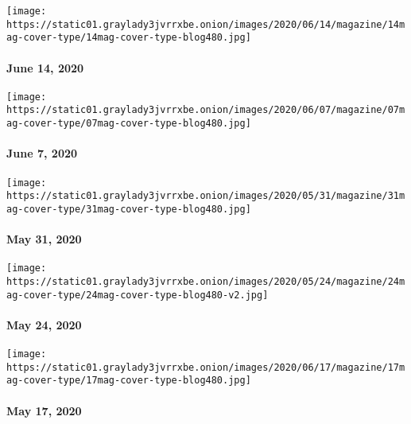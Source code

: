 \href{https://www.nytimes3xbfgragh.onion/issue/magazine/2020/06/12/the-61420-issue}{}

\texttt{[image: https://static01.graylady3jvrrxbe.onion/images/2020/06/14/magazine/14mag-cover-type/14mag-cover-type-blog480.jpg]}

\hypertarget{june-14-2020}{%
\paragraph{June 14, 2020}\label{june-14-2020}}

\href{https://www.nytimes3xbfgragh.onion/issue/magazine/2020/06/05/the-6720-issue}{}

\texttt{[image: https://static01.graylady3jvrrxbe.onion/images/2020/06/07/magazine/07mag-cover-type/07mag-cover-type-blog480.jpg]}

\hypertarget{june-7-2020}{%
\paragraph{June 7, 2020}\label{june-7-2020}}

\href{https://www.nytimes3xbfgragh.onion/issue/magazine/2020/05/29/the-53120-issue}{}

\texttt{[image: https://static01.graylady3jvrrxbe.onion/images/2020/05/31/magazine/31mag-cover-type/31mag-cover-type-blog480.jpg]}

\hypertarget{may-31-2020}{%
\paragraph{May 31, 2020}\label{may-31-2020}}

\href{https://www.nytimes3xbfgragh.onion/issue/magazine/2020/05/22/the-52420-issue}{}

\texttt{[image: https://static01.graylady3jvrrxbe.onion/images/2020/05/24/magazine/24mag-cover-type/24mag-cover-type-blog480-v2.jpg]}

\hypertarget{may-24-2020}{%
\paragraph{May 24, 2020}\label{may-24-2020}}

\href{https://www.nytimes3xbfgragh.onion/issue/magazine/2020/05/24/the-51720-issue}{}

\texttt{[image: https://static01.graylady3jvrrxbe.onion/images/2020/06/17/magazine/17mag-cover-type/17mag-cover-type-blog480.jpg]}

\hypertarget{may-17-2020}{%
\paragraph{May 17, 2020}\label{may-17-2020}}

